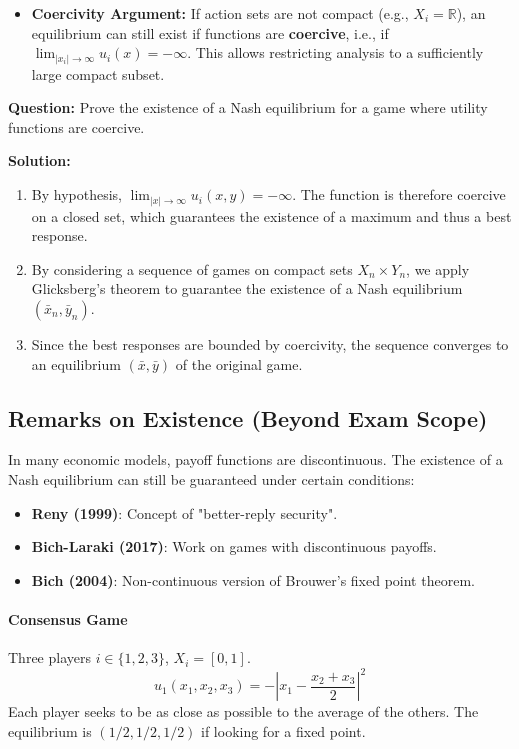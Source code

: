\begin{itemize}
    \item \textbf{Coercivity Argument:} If action sets are not compact (e.g., $X_i = \mathbb{R}$), an equilibrium can still exist if functions are \textbf{coercive}, i.e., if $\lim_{|x_i| \to \infty} u_i(x) = -\infty$. This allows restricting analysis to a sufficiently large compact subset.
\end{itemize}

\begin{exemple}
\textbf{Question:}
Prove the existence of a Nash equilibrium for a game where utility functions are coercive.

\textbf{Solution:}
\begin{enumerate}
    \item By hypothesis, $\lim_{|x| \to \infty} u_i(x, y) = -\infty$. The function is therefore coercive on a closed set, which guarantees the existence of a maximum and thus a best response.
    \item By considering a sequence of games on compact sets $X_n \times Y_n$, we apply Glicksberg's theorem to guarantee the existence of a Nash equilibrium $(\bar{x}_n, \bar{y}_n)$.
    \item Since the best responses are bounded by coercivity, the sequence converges to an equilibrium $(\bar{x}, \bar{y})$ of the original game.
\end{enumerate}
\end{exemple}

\subsection{Remarks on Existence (Beyond Exam Scope)}
In many economic models, payoff functions are discontinuous. The existence of a Nash equilibrium can still be guaranteed under certain conditions:
\begin{itemize}
    \item \textbf{Reny (1999)}: Concept of "better-reply security".
    \item \textbf{Bich-Laraki (2017)}: Work on games with discontinuous payoffs.
    \item \textbf{Bich (2004)}: Non-continuous version of Brouwer's fixed point theorem.
\end{itemize}

\paragraph{Consensus Game}
Three players $i \in \{1,2,3\}$, $X_i = [0,1]$.
\[ u_1(x_1, x_2, x_3) = - \left| x_1 - \frac{x_2 + x_3}{2} \right|^2 \]
Each player seeks to be as close as possible to the average of the others.
The equilibrium is $(1/2, 1/2, 1/2)$ if looking for a fixed point.

